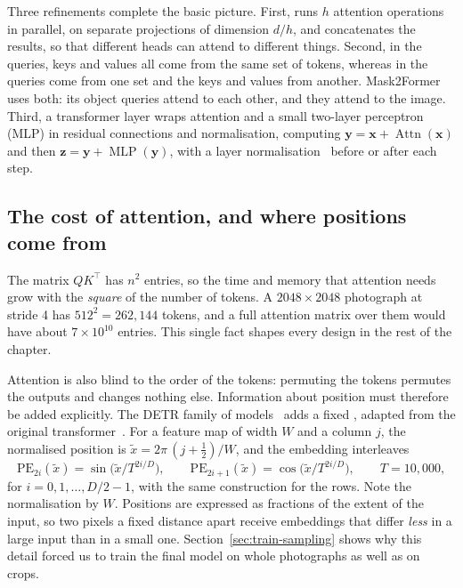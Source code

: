 Three refinements complete the basic picture. First,  runs $h$
attention operations in parallel, on separate projections of dimension $d/h$, and concatenates the
results, so that different heads can attend to different things. Second, in 
the queries, keys and values all come from the same set of tokens, whereas in
 the queries come from one set and the keys and values from another.
Mask2Former uses both: its object queries attend to each other, and they attend to the image.
Third, a transformer layer wraps attention and a small two-layer perceptron (MLP) in residual
connections and normalisation, computing $\mathbf{y} = \mathbf{x} + \operatorname{Attn}(\mathbf{x})$
and then $\mathbf{z} = \mathbf{y} + \operatorname{MLP}(\mathbf{y})$, with a layer
normalisation~\citep{ba2016} before or after each step.

\subsection{The cost of attention, and where positions come from}\label{sec:tr-positions}
The matrix $QK^{\top}$ has $n^2$ entries, so the time and memory that attention needs grow with the
\emph{square} of the number of tokens. A $2048\times2048$ photograph at stride 4 has $512^2 = 262{,}144$
tokens, and a full attention matrix over them would have about $7\times10^{10}$ entries. This single
fact shapes every design in the rest of the chapter.

Attention is also blind to the order of the tokens: permuting the tokens permutes the outputs and
changes nothing else. Information about position must therefore be added explicitly. The DETR family
of models~\citep{detr} adds a fixed , adapted from the original
transformer~\citep{attention}. For a feature map of width $W$ and a
column $j$, the normalised position is $\tilde x = 2\pi\,(j+\tfrac12)/W$, and the embedding
interleaves
\begin{equation}
\mathrm{PE}_{2i}(\tilde x) = \sin\!\big(\tilde x / T^{2i/D}\big), \qquad
\mathrm{PE}_{2i+1}(\tilde x) = \cos\!\big(\tilde x / T^{2i/D}\big), \qquad T = 10{,}000,
\label{eq:tr-sine}
\end{equation}
for $i=0,1,\dots,D/2-1$, with the same construction for the rows. Note the normalisation by $W$.
Positions are expressed as fractions of the extent of the input, so two pixels a fixed distance apart
receive embeddings that differ \emph{less} in a large input than in a small one.
Section~\ref{sec:train-sampling} shows why this detail forced us to train the final model on whole
photographs as well as on crops.

